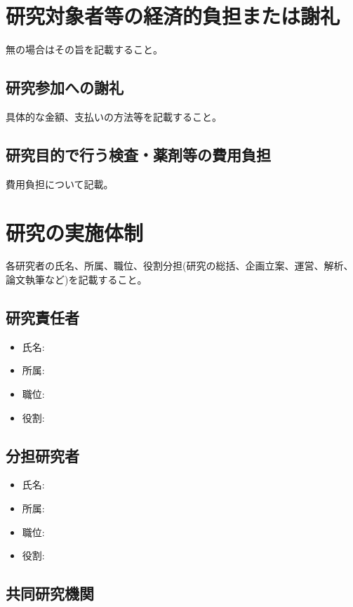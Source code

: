 \documentclass{kyodai-protocol}
\begin{document}
\section{研究対象者等の経済的負担または謝礼}
\label{sec:compensation}

無の場合はその旨を記載すること。

\subsection{研究参加への謝礼}

具体的な金額、支払いの方法等を記載すること。

\subsection{研究目的で行う検査・薬剤等の費用負担}

費用負担について記載。

\section{研究の実施体制}
\label{sec:organization}

各研究者の氏名、所属、職位、役割分担(研究の総括、企画立案、運営、解析、論文執筆など)を記載すること。

\subsection{研究責任者}

\begin{itemize}
\item 氏名:
\item 所属:
\item 職位:
\item 役割:
\end{itemize}

\subsection{分担研究者}

\begin{itemize}
\item 氏名:
\item 所属:
\item 職位:
\item 役割:
\end{itemize}

\subsection{共同研究機関}
\end{document}
